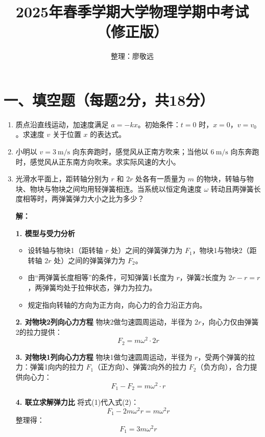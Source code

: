 \documentclass[11pt,a4paper]{article}
\begin{document}
\title{2025年春季学期大学物理学期中考试（修正版）}
\author{整理：廖敬远}
\date{}
\maketitle

\section*{一、填空题（每题2分，共18分）}

\begin{enumerate}
    \item 质点沿直线运动，加速度满足 \( a = -kx \)。初始条件：\( t=0 \) 时，\( x=0 \)，\( v=v_0 \)。求速度 \( v \) 关于位置 \( x \) 的表达式。

    \item 小明以 \( v=3\ \mathrm{m/s} \) 向东奔跑时，感觉风从正南方吹来；当他以 \( 6\ \mathrm{m/s} \) 向东奔跑时，感觉风从正东南方向吹来。求实际风速的大小。

    \item 光滑水平面上，距转轴分别为 \( r \) 和 \( 2r \) 处各有一质量为 \( m \) 的物块，转轴与物块、物块与物块之间均用轻弹簧相连。当系统以恒定角速度 \( \omega \) 转动且两弹簧长度相等时，两弹簧弹力大小之比为多少？
\vspace{0.5em}

\textbf{解：}

\noindent \textbf{1. 模型与受力分析}
\begin{itemize}
    \item 设转轴与物块1（距转轴 \( r \) 处）之间的弹簧弹力为 \( F_1 \)，物块1与物块2（距转轴 \( 2r \) 处）之间的弹簧弹力为 \( F_2 \)。
    \item 由“两弹簧长度相等”的条件，可知弹簧1长度为 \( r \)，弹簧2长度为 \( 2r - r = r \)，两弹簧均处于拉伸状态，弹力为拉力。
    \item 规定指向转轴的方向为正方向，向心力的合力沿正方向。
\end{itemize}

\noindent \textbf{2. 对物块2列向心力方程}
物块2做匀速圆周运动，半径为 \( 2r \)，向心力仅由弹簧2的拉力提供：
\[
F_2 = m \omega^2 \cdot 2r
\tag{1}
\]

\noindent \textbf{3. 对物块1列向心力方程}
物块1做匀速圆周运动，半径为 \( r \)，受两个弹簧的拉力：弹簧1向内的拉力 \( F_1 \)（正方向）、弹簧2向外的拉力 \( F_2 \)（负方向），合力提供向心力：
\[
F_1 - F_2 = m \omega^2 \cdot r
\tag{2}
\]

\noindent \textbf{4. 联立求解弹力比}
将式(1)代入式(2)：
\[
F_1 - 2m\omega^2 r = m\omega^2 r
\]
整理得：
\[
F_1 = 3m\omega^2 r
\]


\end{enumerate}
\end{document}
